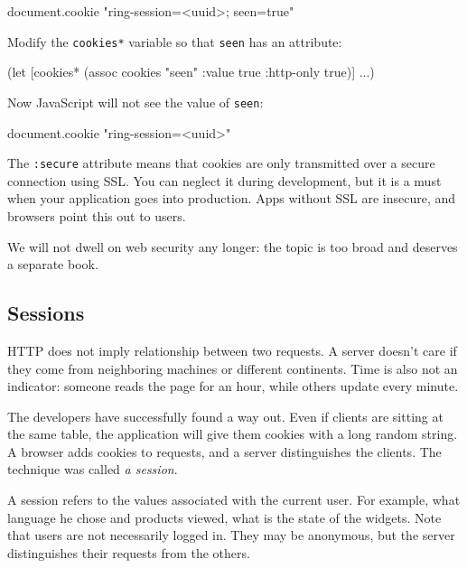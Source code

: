 \begin{english}
\begin{js}
document.cookie
"ring-session=<uuid>; seen=true"
\end{js}
\end{english}

\noindent Modify the \verb|cookies*| variable so that \verb|seen| has an attribute:

\begin{english}
\begin{clojure}
(let [cookies* (assoc cookies "seen"
{:value true :http-only true})]
...)
\end{clojure}
\end{english}

Now JavaScript will not see the value of \verb|seen|:

\begin{english}
\begin{js}
document.cookie
"ring-session=<uuid>"
\end{js}
\end{english}

The \verb|:secure| attribute means that cookies are only transmitted over a secure connection using SSL. You can neglect it during development, but it is a must when your application goes into production. Apps without SSL are insecure, and browsers point this out to users.

We will not dwell on web security any longer: the topic is too broad and deserves a separate book.

\subsection{Sessions}


HTTP does not imply relationship between two requests. A server doesn't care if they come from neighboring machines or different continents. Time is also not an indicator: someone reads the page for an hour, while others update every minute.

The developers have successfully found a way out. Even if clients are sitting at the same table, the application will give them cookies with a long random string. A browser adds cookies to requests, and a server distinguishes the clients. The technique was called \emph{a session}.

A session refers to the values associated with the current user. For example, what language he chose and products viewed, what is the state of the widgets. Note that users are not necessarily logged in. They may be anonymous, but the server distinguishes their requests from the others.

